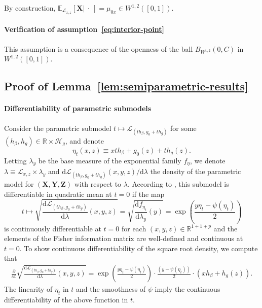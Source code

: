 \documentclass[aos]{imsart}
\theoremstyle{definition}
\theoremstyle{remark}
\newcommand{\E}{\mathbb E}								%
\newcommand{\R}{\mathbb{R}}								%
\newcommand{\prx}{\bm X}								%
\newcommand{\prz}{\bm Z}								%
\newcommand{\pry}{{\bm Y}}								%
\newcommand{\law}{\mathcal L}							%
\renewcommand{\H}{\mathcal H}		 					%
\begin{document}
By construction, $\E_{\law_{x,z}}[\prx |\ \cdot\ ] = \mu_{0x} \in W^{1,2}([0,1])$.

\paragraph*{Verification of assumption~\eqref{eq:interior-point}} This assumption is a consequence of the openness of the ball $B_{W^{1,2}}(0, C)$ in $W^{1,2}([0,1])$.

\subsection{Proof of Lemma~\ref{lem:semiparametric-results}} \label{sec:proof-of-lemma-9}

\paragraph*{Differentiability of parametric submodels}

Consider the parametric submodel $t \mapsto \law_{(th_\beta, g_0 + th_g)}$ for some $(h_\beta, h_g) \in \R \times \H_g$, and denote 
\begin{equation*}
\eta_t(x, z) \equiv x th_\beta+g_0(z)+th_g(z). 
\end{equation*}
Letting $\lambda_{y}$ be the base measure of the exponential family $f_\eta$, we denote $\lambda \equiv \law_{x,z} \times \lambda_{y}$ and $\mathrm d \law_{(th_\beta, g_0 + th_g)}(x, y, z)/\mathrm d \lambda$ the density of the parametric model for $(\prx, \pry, \prz)$ with respect to $\lambda$. According to \citet[Lemma 7.6]{VDV1998}, this submodel is differentiable in quadratic mean at $t = 0$ if the map 
\begin{equation*}
t \mapsto \sqrt{\frac{\mathrm d \law_{(th_\beta, g_0 + th_g)}}{\mathrm d\lambda}(x, y, z)} = \sqrt{\frac{\mathrm df_{\eta_t}}{\mathrm d\lambda_y}(y)} = \exp\left(\frac{y\eta_t-\psi(\eta_t)}{2}\right)
\end{equation*}
is continuously differentiable at $t = 0$ for each $(x,  y, z) \in \R^{1 + 1 + p}$ and the elements of the Fisher information matrix are well-defined and continuous at $t = 0$. To show continuous differentiability of the square root density, we compute that
\begin{align*}
	\frac{\partial}{\partial t}\sqrt{\frac{\mathrm d \law_{(th_\beta, g_0 + th_g)}}{\mathrm d\lambda}(x, y, z)} = \exp\left(\frac{y\eta_t-\psi(\eta_t)}{2}\right)\cdot\frac{(y-\dot{\psi}(\eta_t))}{2}\cdot (xh_\beta + h_g(z)).
\end{align*}
The linearity of $\eta_t$ in $t$ and the smoothness of $\psi$ imply the continuous differentiability of the above function in $t$.
\end{document}
